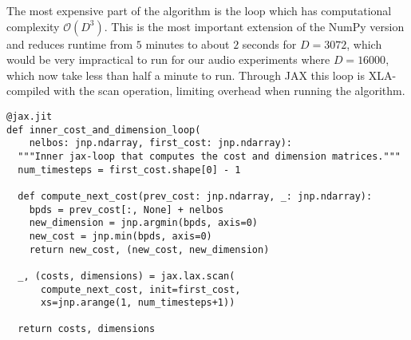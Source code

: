 \documentclass{article} \usepackage{iclr2022_conference,times}
\begin{document}
The most expensive part of the algorithm is the loop which has computational complexity $\mathcal{O}(D^3)$. This is the most important extension of the NumPy version and reduces runtime from $5$ minutes to about $2$ seconds for $D=3072$, which would be very impractical to run for our audio experiments where $D=16000$, which now take less than half a minute to run. Through JAX this loop is XLA-compiled with the scan operation, limiting overhead when running the algorithm. 
\begin{lstlisting}
@jax.jit
def inner_cost_and_dimension_loop(
    nelbos: jnp.ndarray, first_cost: jnp.ndarray):
  """Inner jax-loop that computes the cost and dimension matrices."""
  num_timesteps = first_cost.shape[0] - 1

  def compute_next_cost(prev_cost: jnp.ndarray, _: jnp.ndarray):
    bpds = prev_cost[:, None] + nelbos
    new_dimension = jnp.argmin(bpds, axis=0)
    new_cost = jnp.min(bpds, axis=0)
    return new_cost, (new_cost, new_dimension)

  _, (costs, dimensions) = jax.lax.scan(
      compute_next_cost, init=first_cost,
      xs=jnp.arange(1, num_timesteps+1))

  return costs, dimensions
\end{lstlisting}
\end{document}

